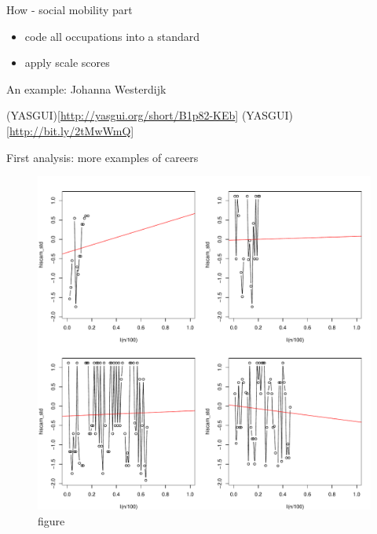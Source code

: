\documentclass[ignorenonframetext,]{beamer}
\providecommand{\tightlist}{%
\setlength{\itemsep}{0pt}\setlength{\parskip}{0pt}}
\begin{document}
\begin{frame}{How - social mobility part}

\begin{itemize}
\tightlist
\item
  code all occupations into a standard
\item
  apply scale scores
\end{itemize}

\end{frame}

\begin{frame}{An example: Johanna Westerdijk}

(YASGUI){[}\url{http://yasgui.org/short/B1p82-KEb}{]}
(YASGUI){[}\url{http://bit.ly/2tMwWmQ}{]}

\end{frame}

\begin{frame}{First analysis: more examples of careers}

\begin{figure}[htbp]
\centering
\includegraphics{../figures/careerexamples.pdf}
\caption{figure}
\end{figure}

\end{frame}
\end{document}
